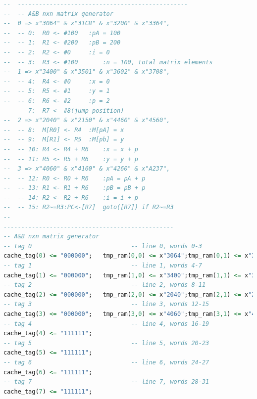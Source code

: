 \documentclass[]{article}
\begin{document}
\begin{lstlisting}[language=vhdl, caption={Matrix generator vhdl}, label={}]
--	------------------------------------------------
--	-- A&B nxn matrix generator
--	0 => x"3064" & x"31C8" & x"3200" & x"3364",
--	-- 0:  R0 <- #100 	:pA = 100
--	-- 1:  R1 <- #200 	:pB = 200
--	-- 2:  R2 <- #0		:i = 0
--	-- 3:  R3 <- #100		:n = 100, total matrix elements
--	1 => x"3400" & x"3501" & x"3602" & x"3708", 
--	-- 4:  R4 <- #0		:x = 0
--	-- 5:  R5 <- #1		:y = 1
--	-- 6:  R6 <- #2		:p = 2
--	-- 7:  R7 <- #8(jump position)
--	2 => x"2040" & x"2150" & x"4460" & x"4560",
--	-- 8:  M[R0] <- R4 	:M[pA] = x
--	-- 9:  M[R1] <- R5 	:M[pb] = y
--	-- 10: R4 <- R4 + R6	:x = x + p
--	-- 11: R5 <- R5 + R6	:y = y + p
--	3 => x"4060" & x"4160" & x"4260" & x"A237",
--	-- 12: R0 <- R0 + R6	:pA = pA + p
--	-- 13: R1 <- R1 + R6	:pB = pB + p
--	-- 14: R2 <- R2 + R6	:i = i + p
--	-- 15: R2~=R3:PC<-[R7]  goto([R7]) if R2~=R3		
--			
------------------------------------------------
-- A&B nxn matrix generator
-- tag 0							-- line 0, words 0-3
cache_tag(0) <= "000000";	tmp_ram(0,0) <= x"3064";tmp_ram(0,1) <= x"31C8";tmp_ram(0,2) <= x"3200";tmp_ram(0,3) <= x"3364";						
-- tag 1							-- line 1, words 4-7
cache_tag(1) <= "000000";	tmp_ram(1,0) <= x"3400";tmp_ram(1,1) <= x"3501";tmp_ram(1,2) <= x"3602";tmp_ram(1,3) <= x"3708";			
-- tag 2							-- line 2, words 8-11
cache_tag(2) <= "000000";	tmp_ram(2,0) <= x"2040";tmp_ram(2,1) <= x"2150";tmp_ram(2,2) <= x"4460";tmp_ram(2,3) <= x"4560";			
-- tag 3							-- line 3, words 12-15
cache_tag(3) <= "000000";	tmp_ram(3,0) <= x"4060";tmp_ram(3,1) <= x"4160";tmp_ram(3,2) <= x"4260";tmp_ram(3,3) <= x"A237";						
-- tag 4							-- line 4, words 16-19
cache_tag(4) <= "111111";			
-- tag 5							-- line 5, words 20-23
cache_tag(5) <= "111111";			
-- tag 6							-- line 6, words 24-27
cache_tag(6) <= "111111";			
-- tag 7							-- line 7, words 28-31
cache_tag(7) <= "111111";			
\end{lstlisting}
\end{document}

